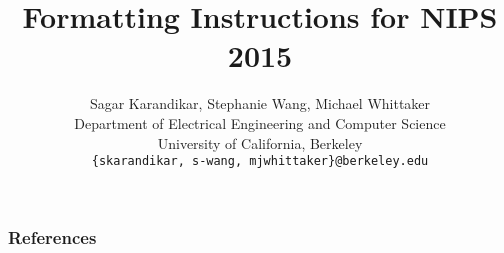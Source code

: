 \documentclass{article}
\title{Formatting Instructions for NIPS 2015}
\author{%
  Sagar Karandikar, Stephanie Wang, Michael Whittaker \\
  Department of Electrical Engineering and Computer Science \\
  University of California, Berkeley \\
  \texttt{\{skarandikar, s-wang, mjwhittaker\}@berkeley.edu} \\
}
\begin{document}
\maketitle

{}
{}
{}
{}
{}
{}
{}

\subsubsection*{References}


\end{document}
